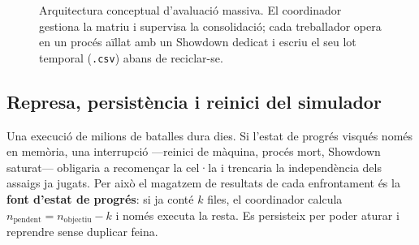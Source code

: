 \begin{figure}[htbp]
{
    }
    \caption{Arquitectura conceptual d'avaluació massiva. El coordinador gestiona la matriu i supervisa la consolidació; cada treballador opera en un procés aïllat amb un Showdown dedicat i escriu el seu lot temporal (\texttt{.csv}) abans de reciclar-se.}
    \label{fig:master_worker_full}
\end{figure}

\subsection{Represa, persistència i reinici del simulador}

Una execució de milions de batalles dura dies. Si l'estat de progrés visqués només en memòria, una interrupció ---reinici de màquina, procés mort, Showdown saturat--- obligaria a recomençar la cel·la i trencaria la independència dels assaigs ja jugats. Per això el magatzem de resultats de cada enfrontament és la \textbf{font d'estat de progrés}: si ja conté $k$ files, el coordinador calcula $n_{\mathrm{pendent}} = n_{\mathrm{objectiu}} - k$ i només executa la resta. Es persisteix per poder aturar i reprendre sense duplicar feina.


